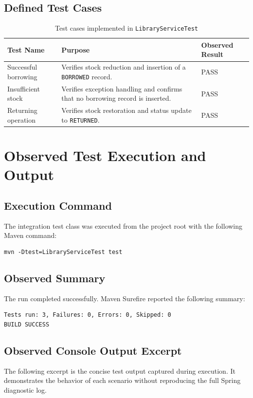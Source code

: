\documentclass[12pt,a4paper]{report}
\begin{document}
\section{Defined Test Cases}
\begin{table}[H]
    \centering
    \caption{Test cases implemented in \texttt{LibraryServiceTest}}
    \begin{tabular}{p{4.2cm} p{7.8cm} p{2cm}}
        \toprule
        \textbf{Test Name} & \textbf{Purpose} & \textbf{Observed Result} \\
        \midrule
        Successful borrowing & Verifies stock reduction and insertion of a \texttt{BORROWED} record. & PASS \\
        Insufficient stock & Verifies exception handling and confirms that no borrowing record is inserted. & PASS \\
        Returning operation & Verifies stock restoration and status update to \texttt{RETURNED}. & PASS \\
        \bottomrule
    \end{tabular}
\end{table}

\chapter{Observed Test Execution and Output}

\section{Execution Command}
The integration test class was executed from the project root with the following Maven command:

\begin{lstlisting}[style=reportcode]
mvn -Dtest=LibraryServiceTest test
\end{lstlisting}

\section{Observed Summary}
The run completed successfully. Maven Surefire reported the following summary:

\begin{lstlisting}[style=reportcode]
Tests run: 3, Failures: 0, Errors: 0, Skipped: 0
BUILD SUCCESS
\end{lstlisting}

\section{Observed Console Output Excerpt}
The following excerpt is the concise test output captured during execution. It demonstrates the behavior of each scenario without reproducing the full Spring diagnostic log.
\end{document}
